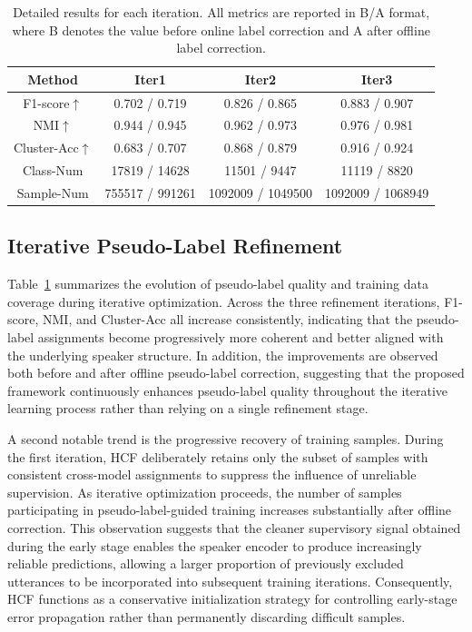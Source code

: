 \documentclass[lettersize,journal]{IEEEtran}
\begin{document}
\begin{table}[!t] %
    \centering
    \caption{ Detailed results for each iteration. All metrics are reported in B/A format, where B denotes the value before online label correction and A after offline label correction.} %
    \setlength{\tabcolsep}{3.6pt} %
    \begin{tabular}{c c c c} %
        \hline
        Method & Iter1 & Iter2 & Iter3   \\
        \hline
        F1-score$\uparrow$  & 0.702 / 0.719 & 0.826 / 0.865 & 0.883 / 0.907 \\  
        NMI$\uparrow$  & 0.944 / 0.945 & 0.962 / 0.973 & 0.976 / 0.981 \\
        Cluster-Acc$\uparrow$  & 0.683 / 0.707 & 0.868 / 0.879 & 0.916 / 0.924 \\
        Class-Num  & 17819 / 14628 & 11501 / 9447 & 11119 / 8820 \\
        Sample-Num  & 755517 / 991261 & 1092009 / 1049500 & 1092009 / 1068949 \\
        \hline
    \end{tabular}
    \label{tab:iteration}
\end{table}
\FloatBarrier

\subsection{Iterative Pseudo-Label Refinement}

Table~\ref{tab:iteration} summarizes the evolution of pseudo-label quality and training data coverage during iterative optimization. Across the three refinement iterations, F1-score, NMI, and Cluster-Acc all increase consistently, indicating that the pseudo-label assignments become progressively more coherent and better aligned with the underlying speaker structure. In addition, the improvements are observed both before and after offline pseudo-label correction, suggesting that the proposed framework continuously enhances pseudo-label quality throughout the iterative learning process rather than relying on a single refinement stage.

A second notable trend is the progressive recovery of training samples. During the first iteration, HCF deliberately retains only the subset of samples with consistent cross-model assignments to suppress the influence of unreliable supervision. As iterative optimization proceeds, the number of samples participating in pseudo-label-guided training increases substantially after offline correction. This observation suggests that the cleaner supervisory signal obtained during the early stage enables the speaker encoder to produce increasingly reliable predictions, allowing a larger proportion of previously excluded utterances to be incorporated into subsequent training iterations. Consequently, HCF functions as a conservative initialization strategy for controlling early-stage error propagation rather than permanently discarding difficult samples.
\end{document}
